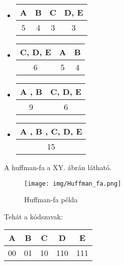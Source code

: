 \documentclass[margin=0px]{article}
\begin{document}
			 \begin{itemize}
				\item \begin{tabular}{|c|c|c|c|}
				 	\hline A & B & C & D, E \\ 
				 	\hline 5 & 4 & 3 & 3 \\ 
				 	\hline 
				 \end{tabular}
			 
				 \item \begin{tabular}{|c|c|c|}
				 	\hline C, D, E & A & B \\ 
				 	\hline 6 & 5 & 4\\ 
				 	\hline 
				 \end{tabular}
				 
				 \item \begin{tabular}{|c|c|}
				 	\hline A , B & C, D, E\\ 
				 	\hline 9 & 6\\ 
				 	\hline 
				 \end{tabular}
				 
				 \item \begin{tabular}{|c|}
				 	\hline A , B , C, D, E\\ 
				 	\hline 15\\ 
				 	\hline 
				 \end{tabular}
			\end{itemize}  
			
			A huffman-fa a XY. ábrán látható.
			
			\begin{figure}[H]
				\centering
				\texttt{[image: img/Huffman\_fa.png]}
				\caption{Huffman-fa példa}
				\label{fig:Huffman_fa}
			\end{figure}
			
			Tehát a kódszavak:
			
			\begin{tabular}{|c|c|c|c|c|}
				\hline A & B & C & D & E \\ 
				\hline 00 & 01 & 10 & 110 & 111 \\ 
				\hline 
			\end{tabular} 
\end{document}

